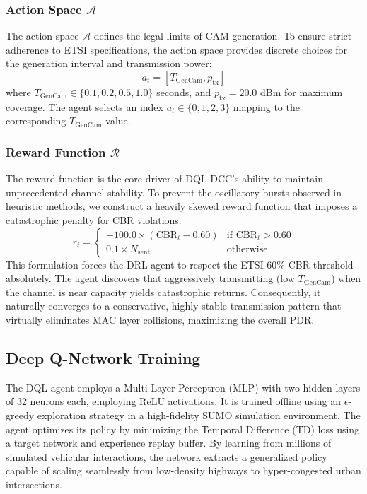 \documentclass[journal]{IEEEtran}
\begin{document}
\subsubsection{Action Space $\mathcal{A}$}
The action space $\mathcal{A}$ defines the legal limits of CAM generation. 
To ensure strict adherence to ETSI specifications, the action space provides
discrete choices for the generation interval and transmission power:
\begin{equation}
a_t = [T_{\text{GenCam}}, p_{\text{tx}}]
\end{equation}
where $T_{\text{GenCam}} \in \{0.1, 0.2, 0.5, 1.0\}$ seconds, and 
$p_{\text{tx}} = 20.0$ dBm for maximum coverage. The agent selects an index 
$a_t \in \{0, 1, 2, 3\}$ mapping to the corresponding $T_{\text{GenCam}}$ value.

\subsubsection{Reward Function $\mathcal{R}$}
The reward function is the core driver of DQL-DCC's ability to maintain
unprecedented channel stability. To prevent the oscillatory bursts observed
in heuristic methods, we construct a heavily skewed reward function that
imposes a catastrophic penalty for CBR violations:
\begin{equation}
r_t = 
\begin{cases}
-100.0 \times (\text{CBR}_t - 0.60) & \text{if } \text{CBR}_t > 0.60 \\
0.1 \times N_{\text{sent}} & \text{otherwise}
\end{cases}
\end{equation}
This formulation forces the DRL agent to respect the ETSI 60\% CBR threshold
absolutely. The agent discovers that aggressively transmitting (low $T_{\text{GenCam}}$)
when the channel is near capacity yields catastrophic returns. Consequently,
it naturally converges to a conservative, highly stable transmission pattern that
virtually eliminates MAC layer collisions, maximizing the overall PDR.

\subsection{Deep Q-Network Training}
The DQL agent employs a Multi-Layer Perceptron (MLP) with two hidden layers
of 32 neurons each, employing ReLU activations. It is trained offline using
an $\epsilon$-greedy exploration strategy in a high-fidelity SUMO simulation
environment. The agent optimizes its policy by minimizing the Temporal Difference (TD)
loss using a target network and experience replay buffer. 
By learning from millions of simulated vehicular interactions, the network extracts
a generalized policy capable of scaling seamlessly from low-density highways to
hyper-congested urban intersections.
\end{document}
